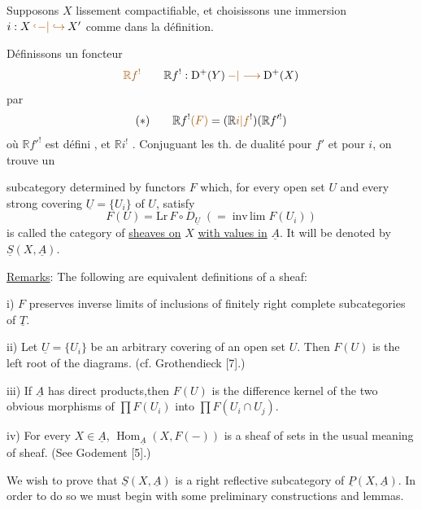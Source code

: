 Supposons $X$ lissement compactifiable, et choisissons une immersion $i:X\mathbin{\unsure{\lhook\joinrel-|\hookrightarrow}}X'$ comme dans la définition.


Définissons un foncteur
\[
\deleted{\unsure{\mathbb{R}f^!}}
\qquad \mathbb{R}f^!:\mathrm D^+(Y)\mathbin{\unsure{-|\longrightarrow}}\mathrm D^+(X)
\]
par
\[
(*)\qquad \mathbb{R}f^!\deleted{\unsure{(F)}}=(\mathbb{R}\unsure{i|f}^!)(\mathbb{R}f'^!)
\]
où $\mathbb{R}f'^!$ est défini \unsure{---}, et $\mathbb{R}i^!$  \unsure{---}.
Conjuguant les th. de dualité pour $f'$ et pour $i$, on trouve un

subcategory determined by functors $F$ which, for every open set $U$ and every strong covering $\underline U=\{U_i\}$ of $U$, satisfy
\[
F(U)=\mathrm{Lr}\,F\circ D_{\underline U}\;(=\operatorname{inv\,lim}F(U_i))
\]
is called the category of \uline{sheaves on} $X$ \uline{with values in} $\underline A$. It will be denoted by $\underline S(X,\underline A)$.

\uline{Remarks}: The following are equivalent definitions of a sheaf:

i) $F$ preserves inverse limits of inclusions of finitely right complete subcategories of $\underline T$.

ii) Let $\underline U=\{U_i\}$ be an arbitrary covering of an open set $U$. Then $F(U)$ is the left root of the diagrams.
(cf. Grothendieck [7].)

iii) If $\underline A$ has direct products,then $F(U)$ is the difference kernel of the two obvious morphisms of $\prod F(U_i)$ into $\prod F(U_i\cap U_j)$.

iv) For every $X\in\underline A$, $\operatorname{Hom}_{\underline A}(X,F(-))$ is a sheaf of sets in the usual meaning of sheaf. (See Godement [5].)

We wish to prove that $\underline S(X,\underline A)$ is a right reflective subcategory of $\underline P(X,\underline A)$. In order to do so we must begin with some preliminary constructions and lemmas.

